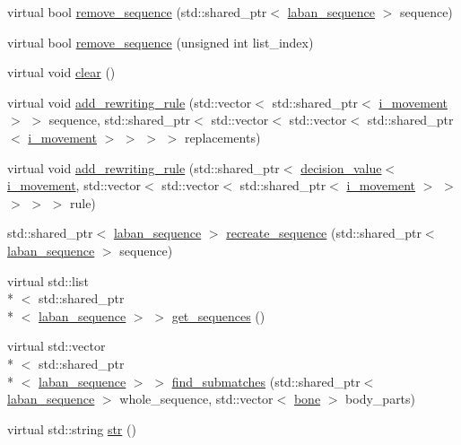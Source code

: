 \begin{DoxyCompactItemize}
\item 
virtual bool \hyperlink{classmae_1_1fl_1_1laban_1_1decision__forest_a24a8f97645622dbd96543763821dc6e5}{remove\-\_\-sequence} (std\-::shared\-\_\-ptr$<$ \hyperlink{classmae_1_1fl_1_1laban_1_1laban__sequence}{laban\-\_\-sequence} $>$ sequence)
\item 
virtual bool \hyperlink{classmae_1_1fl_1_1laban_1_1decision__forest_a41951d257154b85832f3d6beea13d4e6}{remove\-\_\-sequence} (unsigned int list\-\_\-index)
\item 
virtual void \hyperlink{classmae_1_1fl_1_1laban_1_1decision__forest_aa623f14cda0e8d9566716be9bd6f74d4}{clear} ()
\item 
virtual void \hyperlink{classmae_1_1fl_1_1laban_1_1decision__forest_a639c688ff26b2ecf20f30ae731d7f44f}{add\-\_\-rewriting\-\_\-rule} (std\-::vector$<$ std\-::shared\-\_\-ptr$<$ \hyperlink{classmae_1_1fl_1_1laban_1_1i__movement}{i\-\_\-movement} $>$ $>$ sequence, std\-::shared\-\_\-ptr$<$ std\-::vector$<$ std\-::vector$<$ std\-::shared\-\_\-ptr$<$ \hyperlink{classmae_1_1fl_1_1laban_1_1i__movement}{i\-\_\-movement} $>$ $>$ $>$ $>$ replacements)
\item 
virtual void \hyperlink{classmae_1_1fl_1_1laban_1_1decision__forest_a967fa135b60859542d073b1df27e39c8}{add\-\_\-rewriting\-\_\-rule} (std\-::shared\-\_\-ptr$<$ \hyperlink{classmae_1_1fl_1_1laban_1_1decision__value}{decision\-\_\-value}$<$ \hyperlink{classmae_1_1fl_1_1laban_1_1i__movement}{i\-\_\-movement}, std\-::vector$<$ std\-::vector$<$ std\-::shared\-\_\-ptr$<$ \hyperlink{classmae_1_1fl_1_1laban_1_1i__movement}{i\-\_\-movement} $>$ $>$ $>$ $>$ $>$ rule)
\item 
std\-::shared\-\_\-ptr$<$ \hyperlink{classmae_1_1fl_1_1laban_1_1laban__sequence}{laban\-\_\-sequence} $>$ \hyperlink{classmae_1_1fl_1_1laban_1_1decision__forest_ab295e95474c126e9f61c67897bc456f5}{recreate\-\_\-sequence} (std\-::shared\-\_\-ptr$<$ \hyperlink{classmae_1_1fl_1_1laban_1_1laban__sequence}{laban\-\_\-sequence} $>$ sequence)
\item 
virtual std\-::list\\*
$<$ std\-::shared\-\_\-ptr\\*
$<$ \hyperlink{classmae_1_1fl_1_1laban_1_1laban__sequence}{laban\-\_\-sequence} $>$ $>$ \hyperlink{classmae_1_1fl_1_1laban_1_1decision__forest_a023111c5a44a950677d99412b4bad7d2}{get\-\_\-sequences} ()
\item 
virtual std\-::vector\\*
$<$ std\-::shared\-\_\-ptr\\*
$<$ \hyperlink{classmae_1_1fl_1_1laban_1_1laban__sequence}{laban\-\_\-sequence} $>$ $>$ \hyperlink{classmae_1_1fl_1_1laban_1_1decision__forest_a8516b4336ab69541927a9f2d2f4f0d85}{find\-\_\-submatches} (std\-::shared\-\_\-ptr$<$ \hyperlink{classmae_1_1fl_1_1laban_1_1laban__sequence}{laban\-\_\-sequence} $>$ whole\-\_\-sequence, std\-::vector$<$ \hyperlink{classmae_1_1bone}{bone} $>$ body\-\_\-parts)
\item 
virtual std\-::string \hyperlink{classmae_1_1fl_1_1laban_1_1decision__forest_a23977c20fd4923e0cb4da1ba380821c3}{str} ()
\end{DoxyCompactItemize}


